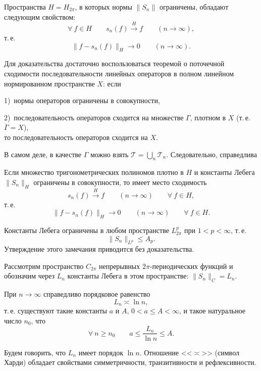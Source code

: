 Пространства {$H=H_{2\pi}$}, в {которых} нормы {$\|S_n\|$} ограничены, обладают
следующим свойством:
$$ \forall\ f\in H\qquad s_n(f) \stackrel{H}{\longrightarrow} f\qquad {(n\rightarrow\infty)} , $$
т.\,е.
$$ \|f-s_n(f)\|_H \to 0\qquad (n\to \infty). $$

Для доказательства достаточно воспользоваться теоремой о поточечной сходимости
последовательности {линейных} операторов {в полном линейном} {нормированном
пространстве $X$:} если

1)~нормы операторов ограничены в совокупности,

2)~последовательность операторов сходится на множестве $\Gamma$, плотном в {$X$ (т.\,е.}
\mbox{$\overline{\Gamma}=X$)},\\
то последовательность
операторов сходится на {$X$}.

В самом деле, в качестве $\Gamma$ можно взять $\mathcal{T}=\bigcup\limits_n {\mathcal{T}_n}$.
Следовательно, справедлива

\begin{teo}
Если множество тригонометрических полиномов плотно в $H$ и константы Лебега
$\|S_n\|_H$ ограничены в совокупности, то имеет место сходимость
$$
s_n(f) \stackrel{H}{\longrightarrow} f\qquad (n\rightarrow\infty) \qquad \forall\ f\in H,
$$
т.\,е.
$$
\|f-s_n(f)\|_H \to 0 \qquad (n\to \infty) \qquad \forall\ f\in H.
$$
\end{teo}

\begin{Remark}
Константы Лебега ограничены в любом пространстве $L^p_{2\pi}$ при $1<p<\infty$, т.\,е.
$$
\|S_n\|_{L^p}\le A_p.
$$
Утверждение этого замечания приводится без доказательства.
\end{Remark}

Рассмотрим пространство $C_{2\pi}$ непрерывных
$2\pi$-периодических функций и обозначим через $L_n$ константы Лебега в
этом пространстве: $\|S_n\|_C=L_n.$

\begin{teo}\label{l5-ln}
При $n\rightarrow \infty$ справедливо порядковое равенство
$$
L_n \asymp \ln n,
$$
т.\,е. существуют такие константы $a$ и $A$, $0<a\le A<\infty$,
и такое натуральное число $n_0$, что
$$
\forall\ n\ge n_0 \qquad a\le \frac{L_n}{\ln n}\le A.
$$
\end{teo}

Будем говорить, что $L_n$ имеет порядок $\ln n$. Отношение <<$\asymp$>> (символ Харди) обладает свойствами симметричности, транзитивности и
рефлексивности.

